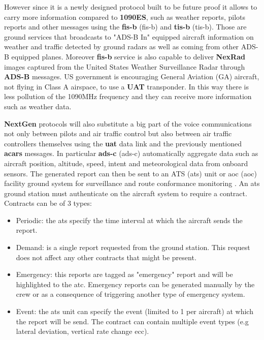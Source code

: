 \documentclass[../main.tex]{subfiles}
\begin{document}
However since it is a newly designed protocol built to be future proof it allows to carry more information compared to \textbf{1090ES}, such as weather reports, pilots reports and other messages using the \textbf{\acrshort{fis-b}} (\acrlong{fis-b}) and \textbf{\acrshort{tis-b}} (\acrlong{tis-b}). Those are ground services that broadcasts to "ADS-B In" equipped aircraft information on weather and traffic detected by ground radars as well as coming from other ADS-B equipped planes. Moreover \textbf{\acrshort{fis-b}} service is also capable to deliver \textbf{NexRad} images captured from the United States Weather Surveillance Radar through \textbf{ADS-B} messages. US government is encouraging General Aviation (GA) aircraft, not flying in Class A airspace, to use a \textbf{UAT} transponder. In this way there is less pollution of the 1090MHz frequency and they can receive more information such as weather data.

\textbf{NextGen} protocols will also substitute a big part of the voice communications not only between pilots and air traffic control but also between air traffic controllers themselves using the \textbf{\acrshort{uat}} data link and the previously mentioned \textbf{\acrshort{acars}} messages.
In particular \textbf{\acrshort{ads-c}} (\acrlong{ads-c}) automatically aggregate data such as aircraft position, altitude, speed, intent and meteorological data from onboard sensors. The generated report can then be sent to an ATS (\acrlong{ats}) unit or \acrshort{aoc} (\acrlong{aoc}) facility ground system for surveillance and route conformance monitoring \cite{goldman}. An \acrshort{ats}  ground station must authenticate on the aircraft system to require a contract. Contracts can be of 3 types:

\begin{itemize}
  \item Periodic: the \acrshort{ats} specify the time interval at which the aircraft sends the report.
  \item Demand: is a single report requested from the ground station. This request does not affect any other contracts that might be present.
  \item Emergency: this reports are tagged as "emergency" report and will be highlighted to the \acrshort{atc}. Emergency reports can be generated manually by the crew or as a consequence of triggering another type of emergency system.
  \item Event: the \acrshort{ats} unit can specify the event (limited to 1 per aircraft) at which the report will be send. The contract can contain multiple event types (e.g lateral deviation, vertical rate change ecc).
\end{itemize}
\end{document}
